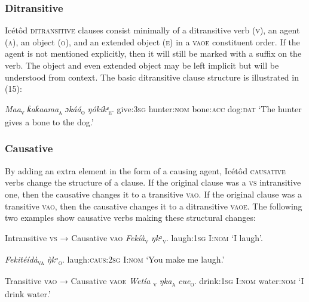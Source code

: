 \subsubsection{Ditransitive}

Icétôd \textsc{ditransitive} clauses consist minimally of a ditransitive verb (\textsc{v}), an agent (\textsc{a}), an object (\textsc{o}), and an extended object (\textsc{e}) in a \textsc{vaoe} constituent order. If the agent is not mentioned explicitly, then it will still be marked with a suffix on the verb. The object and even extended object may be left implicit but will be understood from context. The basic ditransitive clause structure is illustrated in (15):




\textit{Maa}\textsc{\textsubscript{v}}\textit{}     \textit{ƙaƙaama}\textsc{\textsubscript{a}}\textit{   ɔkáá}\textsc{\textsubscript{o}}\textit{     ŋókíkᵉ}\textsc{\textsubscript{e}}.
give:\textsc{3sg}   hunter:\textsc{nom}   bone:\textsc{acc}   dog:\textsc{dat}
‘The hunter gives a bone to the dog.’




\subsubsection{Causative}

By adding an extra element in the form of a causing agent, Icétôd \textsc{causative} verbs change the structure of a clause. If the original clause was a \textsc{vs} intransitive one, then the causative changes it to a transitive \textsc{vao}. If the original clause was a transitive \textsc{vao}, then the causative changes it to a ditransitive \textsc{vaoe}. The following two examples show causative verbs making these structural changes:




Intransitive \textsc{vs} → Causative \textsc{vao}
\textit{Fekíà}\textsc{\textsubscript{v}}     \textit{ŋkᵃ}\textsc{\textsubscript{v}}.
laugh:\textsc{1sg}   I:\textsc{nom}
‘I laugh’.




\textit{Fekitéídà}\textsc{\textsubscript{va}}   \textit{\`{ŋ}kᵃ}\textsc{\textsubscript{o}}.
laugh:\textsc{caus:2sg} I:\textsc{nom}
‘You make me laugh.’





Transitive \textsc{vao} → Causative \textsc{vaoe}
\textit{Wetía}\textsc{\textsubscript{ v}}     \textit{ŋka}\textsc{\textsubscript{a}}\textit{     cue}\textsc{\textsubscript{o}}.
drink:\textsc{1sg}   I:\textsc{nom}   water:\textsc{nom}
‘I drink water.’




